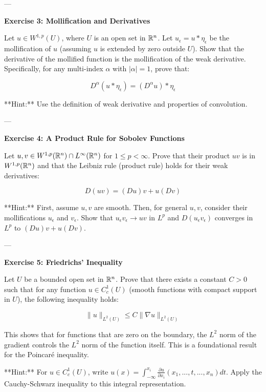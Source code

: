 \documentclass[12pt,a4paper]{report}
\begin{document}
\begin{description}
\begin{description}
---

\item  \textbf{Exercise 3: Mollification and Derivatives}

Let \( u \in W^{1,p}(U) \), where \( U \) is an open set in \( \mathbb{R}^n \). Let \( u_\epsilon = u * \eta_\epsilon \) be the mollification of \( u \) (assuming \( u \) is extended by zero outside \( U \)). Show that the derivative of the mollified function is the mollification of the weak derivative. Specifically, for any multi-index \( \alpha \) with \( |\alpha| = 1 \), prove that:

\[ D^\alpha (u * \eta_\epsilon) = (D^\alpha u) * \eta_\epsilon \]

**Hint:** Use the definition of weak derivative and properties of convolution.

---

\item  \textbf{Exercise 4: A Product Rule for Sobolev Functions}

Let \( u, v \in W^{1,p}(\mathbb{R}^n) \cap L^\infty(\mathbb{R}^n) \) for \( 1 \leq p < \infty \). Prove that their product \( uv \) is in \( W^{1,p}(\mathbb{R}^n) \) and that the Leibniz rule (product rule) holds for their weak derivatives:

\[ D(uv) = (Du)v + u(Dv) \]

**Hint:** First, assume \( u, v \) are smooth. Then, for general \( u, v \), consider their mollifications \( u_\epsilon \) and \( v_\epsilon \). Show that \( u_\epsilon v_\epsilon \to uv \) in \( L^p \) and \( D(u_\epsilon v_\epsilon) \) converges in \( L^p \) to \( (Du)v + u(Dv) \).

---

\item \textbf{Exercise 5: Friedrichs' Inequality}

Let \( U \) be a bounded open set in \( \mathbb{R}^n \). Prove that there exists a constant \( C > 0 \) such that for any function \( u \in C_c^1(U) \) (smooth functions with compact support in \( U \)), the following inequality holds:

\[ \|u\|_{L^2(U)} \leq C \|\nabla u\|_{L^2(U)} \]

This shows that for functions that are zero on the boundary, the \( L^2 \) norm of the gradient controls the \( L^2 \) norm of the function itself. This is a foundational result for the Poincaré inequality.

**Hint:** For \( u \in C_c^1(U) \), write \( u(x) = \int_{-\infty}^{x_i} \frac{\partial u}{\partial x_i}(x_1, ..., t, ..., x_n) dt \). Apply the Cauchy-Schwarz inequality to this integral representation.


\end{description}
\end{description}
\end{document}
